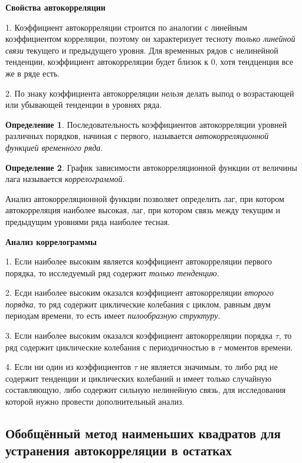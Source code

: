 \documentclass[aps,%
12pt,%
final,%
oneside,
onecolumn,%
musixtex, %
superscriptaddress,%
centertags]{article} %
\theoremstyle{plain}
\theoremstyle{definition}
\newtheorem{definition}{Определение}[subsection]
\theoremstyle{remark}
\begin{document}
\textbf{Свойства автокорреляции}

1. Коэффициент автокорреляции строится по аналогии с линейным коэффициентом корреляции, поэтому он характеризует тесноту \textit{только линейной связи} текущего и предыдущего уровня. Для временных рядов с нелинейной тенденции, коэффициент автокорреляции будет близок к $0$, хотя тендценция все же в ряде есть.

2. По знаку коэффициента автокорреляции \textit{нельзя} делать выпод о возрастающей или убывающей тенденции в уровнях ряда.

\begin{definition}
	Последовательность коэффициентов автокорреляции уровней различных порядков, начиная с первого, называется \textit{автокорреляционной функцией временного ряда}.
\end{definition}

\begin{definition}
	График зависимости автокорреляционной функции от величины лага называется \textit{коррелограммой}.
\end{definition}

Анализ автокорреляционной функции позволяет определить лаг, при котором автокорреляция наиболее высокая, лаг, при котором связь между текущим и предыдущим уровнями ряда наиболее тесная.

\textbf{Анализ коррелограммы}

1. Если наиболее высоким является коэффициент автокорреляции первого порядка, то исследуемый ряд содержит \textit{только тенденцию}.

2. Есди наиболее высоким оказался коэффициент автокорреляции \textit{второго порядка}, то ряд содержит циклические колебания с циклом, равным двум периодам времени, то есть имеет \textit{пилообразную структуру}.

3. Если наиболее высоким оказался коэффициент автокорреляции порядка $\tau$, то ряд содержит циклические колебания с периодичностью в $\tau$ моментов времени.

4. Если ни один из коэффициентов $\tau$ не является значимым, то либо ряд не содержит тенденции и циклических колебаний и имеет только случайную составляющую, либо содержит сильную нелинейную связь, для исследования которой нужно провести дополнительный анализ.


\newpage
\subsection{Обобщённый метод наименьших квадратов для устранения автокорреляции в остатках}
\end{document}
